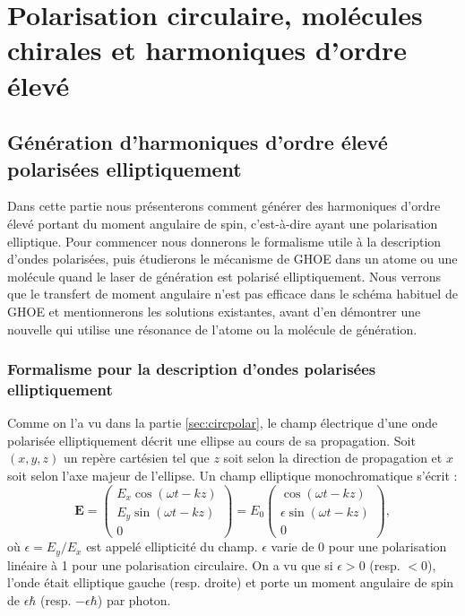 \part{Polarisation circulaire, molécules chirales et harmoniques d'ordre élevé}
\label{PA:Spin_HHG}
\chapter{Génération d'harmoniques d'ordre élevé polarisées elliptiquement}
\label{CH:Circular_HHG}
Dans cette partie nous présenterons comment générer des harmoniques d'ordre élevé portant du moment angulaire de spin, c'est-à-dire ayant une polarisation elliptique. Pour commencer nous donnerons le formalisme utile à la description d'ondes polarisées, puis étudierons le mécanisme de GHOE dans un atome ou une molécule quand le laser de génération est polarisé elliptiquement. Nous verrons que le transfert de moment angulaire n'est pas efficace dans le schéma habituel de GHOE et mentionnerons les solutions existantes, avant d'en démontrer une nouvelle qui utilise une résonance de l'atome ou la molécule de génération.

\section{Formalisme pour la description d'ondes polarisées elliptiquement}
\label{sec:polardef}
Comme on l'a vu dans la partie \ref{sec:circpolar}, le champ électrique d'une onde polarisée elliptiquement décrit une ellipse au cours de sa propagation. Soit $(x,y,z)$ un repère cartésien tel que $z$ soit selon la direction de propagation et $x$ soit selon l'axe majeur de l'ellipse. Un champ elliptique monochromatique s'écrit :
\begin{equation}
\bm{E}=\begin{pmatrix}
E_{x}\cos{(\omega t-kz)}\\
E_{y}\sin{(\omega t-kz)}\\
0
\end{pmatrix}=E_{0}
\begin{pmatrix}
\cos{(\omega t-kz)}\\
\epsilon\sin{(\omega t-kz)}\\
0
\end{pmatrix},
\label{eq:jones}
\end{equation}
où $\epsilon = E_{y}/E_{x}$ est appelé ellipticité du champ. $\epsilon$ varie de 0 pour une polarisation linéaire à 1 pour une polarisation circulaire.  On a vu que si $\epsilon>0$ (resp. $<0$), l'onde était elliptique gauche (resp. droite) et porte un moment angulaire de spin de $\epsilon\hbar$ (resp. $-\epsilon\hbar$) par photon. 

